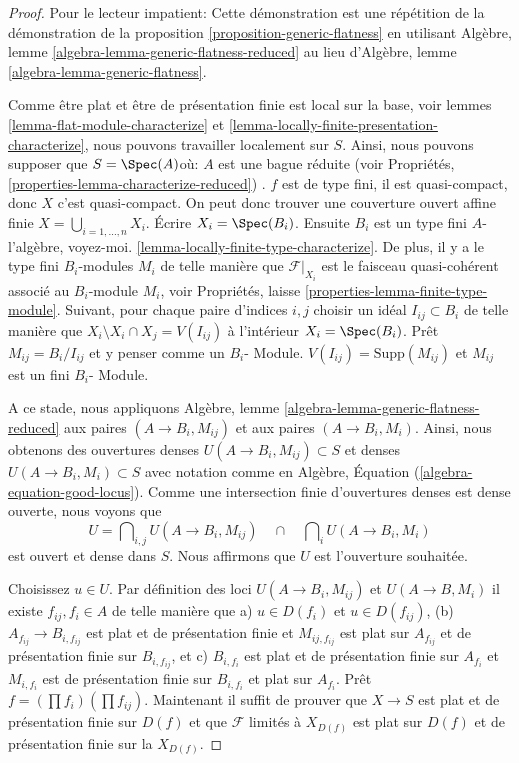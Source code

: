 \begin{proof}
Pour le lecteur impatient: Cette démonstration est une répétition de la démonstration de la proposition \ref{proposition-generic-flatness} en utilisant Algèbre, lemme \ref{algebra-lemma-generic-flatness-reduced} au lieu d'Algèbre, lemme \ref{algebra-lemma-generic-flatness}.

\medskip\noindent

Comme être plat et être de présentation finie est local sur la base, voir lemmes \ref{lemma-flat-module-characterize} et
\ref{lemma-locally-finite-presentation-characterize}, nous pouvons travailler localement sur $S$. Ainsi, nous pouvons supposer que
$S = \Spec(A)$où: $A$ est une bague réduite (voir Propriétés, \ref{properties-lemma-characterize-reduced}) . $f$ est de type fini, il est quasi-compact, donc $X$ c'est quasi-compact. On peut donc trouver une couverture ouvert affine finie
$X = \bigcup_{i = 1, \ldots, n} X_i$. Écrire $X_i = \Spec(B_i)$. Ensuite $B_i$ est un type fini $A$-l'algèbre, voyez-moi. \ref{lemma-locally-finite-type-characterize}. De plus, il y a le type fini
$B_i$-modules $M_i$ de telle manière que $\mathcal{F}|_{X_i}$ est le faisceau quasi-cohérent associé au $B_i$-module $M_i$, voir Propriétés, laisse \ref{properties-lemma-finite-type-module}. Suivant, pour chaque paire d'indices $i, j$ choisir un idéal $I_{ij} \subset B_i$
de telle manière que $X_i \setminus X_i \cap X_j = V(I_{ij})$ à l'intérieur
$X_i = \Spec(B_i)$. Prêt $M_{ij} = B_i/I_{ij}$ et y penser comme un $B_i$- Module. $V(I_{ij}) = \text{Supp}(M_{ij})$
et $M_{ij}$ est un fini $B_i$- Module.

\medskip\noindent
A ce stade, nous appliquons Algèbre, lemme \ref{algebra-lemma-generic-flatness-reduced} aux paires $(A \to B_i, M_{ij})$ et aux paires $(A \to B_i, M_i)$. Ainsi, nous obtenons des ouvertures denses $U(A \to B_i, M_{ij}) \subset S$ et denses $U(A \to B_i, M_i) \subset S$ avec notation comme en Algèbre, Équation (\ref{algebra-equation-good-locus}). Comme une intersection finie d'ouvertures denses est dense ouverte, nous voyons que $$
U =
\bigcap\nolimits_{i, j} U(A \to B_i, M_{ij})
\quad\cap\quad
\bigcap\nolimits_i U(A \to B_i, M_i)
$$ est ouvert et dense dans $S$. Nous affirmons que $U$ est l'ouverture souhaitée.

\medskip\noindent

Choisissez $u \in U$. Par définition des loci $U(A \to B_i, M_{ij})$
et $U(A \to B, M_i)$ il existe $f_{ij}, f_i \in A$ de telle manière que a) $u \in D(f_i)$ et $u \in D(f_{ij})$, (b) $A_{f_{ij}} \to B_{i, f_{ij}}$ est plat et de présentation finie et $M_{ij, f_{ij}}$ est plat sur $A_{f_{ij}}$ et de présentation finie sur $B_{i, f_{ij}}$, et c) $B_{i, f_i}$ est plat et de présentation finie sur $A_{f_i}$ et
$M_{i, f_i}$ est de présentation finie sur $B_{i, f_i}$ et plat sur
$A_{f_i}$. Prêt
$f = (\prod f_i) (\prod f_{ij})$. Maintenant il suffit de prouver que $X \to S$ est plat et de présentation finie sur $D(f)$ et que $\mathcal{F}$ limités à $X_{D(f)}$ est plat sur $D(f)$ et de présentation finie sur la $X_{D(f)}$.


\end{proof}
